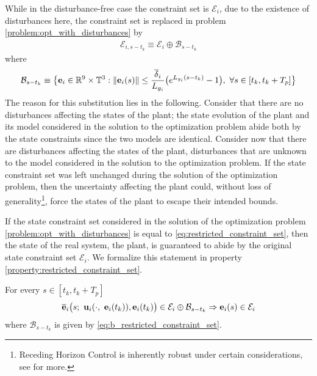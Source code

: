 
While in the disturbance-free case the constraint set is $\mathcal{E}_i$,
due to the existence of disturbances here, the constraint set is replaced in
problem \eqref{problem:opt_with_disturbances} by
\begin{align}
  \mathcal{E}_{i, s-t_k} \equiv \mathcal{E}_i \oplus \mathcal{B}_{s-t_k}
\label{eq:restricted_constraint_set}
\end{align}
where
\begin{align}
  \mathcal{B}_{s-t_k} \equiv \big\{ \bm{\mathbf{e}}_i \in \mathbb{R}^9 \times \mathbb{T}^3 :
    \|\bm{\mathbf{e}}_i(s)\| \leq \dfrac{\overline{\delta}_i}{L_{g_i}}\big( e^{L_{g_i}(s - t_k)} - 1\big),\ \forall s \in [t_k, t_k + T_p] \big\}
\label{eq:b_restricted_constraint_set}
\end{align}
The reason for this substitution lies in the following. Consider that there
are no disturbances affecting the states of the plant; the state evolution of
the plant and its model considered in the solution to the optimization problem
abide both by the state constraints since the two models are identical. Consider
now that there are disturbances affecting the states of the plant, disturbances
that are unknown to the model considered in the solution to the optimization
problem. If the state constraint set was left unchanged during the solution of
the optimization problem, then the uncertainty affecting the plant could,
without loss of generality\footnote{Receding Horizon Control is inherently robust
under certain considerations, see \cite{Fontes2007} for more.}, force the states
of the plant to escape their intended bounds.

If the state constraint set considered in the solution of the optimization
problem \eqref{problem:opt_with_disturbances} is equal to
\eqref{eq:restricted_constraint_set}, then the state of the real system,
the plant, is guaranteed to abide by the original state constraint set
$\mathcal{E}_i$. We formalize this statement in property
\eqref{property:restricted_constraint_set}.

\begin{bw_box}
\begin{property}

  For every $s \in [t_k, t_k + T_p]$
  \begin{align}
    \overline{\bm{\mathbf{e}}}_i\big( s;\ \bm{\mathbf{u}}_i(\cdot,\ \bm{\mathbf{e}}_i(t_k)), \bm{\mathbf{e}}_i(t_k) \big) \in \mathcal{E}_i \oplus \mathcal{B}_{s-t_k}
    \Rightarrow
    \bm{\mathbf{e}}_i(s) \in \mathcal{E}_i
  \end{align}
  where $\mathcal{B}_{s-t_k}$ is given by \eqref{eq:b_restricted_constraint_set}.
\label{property:restricted_constraint_set}
\end{property}
\end{bw_box}

